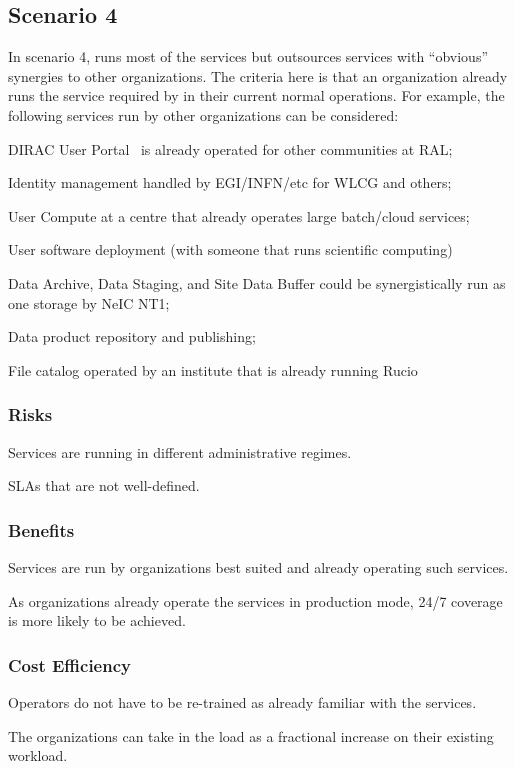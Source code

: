 \documentclass[12pt,a4paper]{article}
\begin{document}
\subsection{Scenario 4}
\label{ssec:scen4}

In scenario 4, \EC runs most of the services but outsources services with ``obvious'' synergies to other organizations.
The criteria here is that an organization already runs the service required by \ED in their current normal operations.
For example, the following services run by other organizations can be considered:
\bitm
  \item DIRAC User Portal~\cite{dirac} is already operated for other communities at RAL;
  \item Identity management handled by EGI/INFN/etc for WLCG and others;
  \item User Compute at a centre that already operates large batch/cloud services;
  \item User software deployment (with someone that runs scientific computing)
  \item Data Archive, Data Staging, and Site Data Buffer could be synergistically run as one storage by NeIC NT1;
  \item Data product repository and publishing;
  \item File catalog operated by an institute that is already running Rucio~\cite{rucio}
\eitm
  
\subsubsection*{Risks}
\bitm
\item Services are running in different administrative regimes.
  \item SLAs that are not well-defined. 
\eitm

\subsubsection*{Benefits}
\bitm
  \item Services are run by organizations best suited and already operating such services.
  \item As organizations already operate the services in production mode, 24/7 coverage is more likely to be achieved.
\eitm

\subsubsection*{Cost Efficiency}
\bitm
\item Operators do not have to be re-trained as already familiar with the services.
\item The organizations can take in the \ED load as a fractional increase on their existing workload.
\eitm
\end{document}
